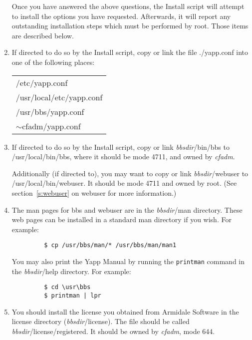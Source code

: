 \documentclass[twoside]{report}
\begin{document}
\begin{enumerate}
      Once you have answered the above questions, the Install script will 
      attempt to install the options you have requested.  Afterwards, it
      will report any outstanding installation steps which must be performed
      by root.  Those items are described below.

   \item If directed to do so by the Install script, copy or link the 
      file ./yapp.conf into one of the following places:

      \begin{tabular}{l}
      /etc/yapp.conf \\
      /usr/local/etc/yapp.conf \\
      /usr/bbs/yapp.conf \\
      $\sim$cfadm/yapp.conf\\
      \end{tabular}

   \item If directed to do so by the Install script, copy or link 
         {\em bbsdir}/bin/bbs to /usr/local/bin/bbs, where it should be 
         mode 4711, and owned by {\em cfadm}.

         Additionally (if directed to), you may want to copy or link 
         {\em bbsdir}/webuser to /usr/local/bin/webuser.  It 
         should be mode 4711 and owned by root.  (See section~\ref{s:webuser} 
         on webuser for more information.)

   \item The man pages for bbs and webuser are in the {\em bbsdir}/man 
         directory.  These web pages can be installed in a standard man 
         directory if you wish.  For example:
         \begin{verbatim}
         $ cp /usr/bbs/man/* /usr/bbs/man/man1
         \end{verbatim}
         \vspace{-12pt}
   
         You may also print the Yapp Manual by running the 
         {\tt printman} command in the {\em bbsdir}/help 
         directory.  For example:
         \begin{verbatim}
         $ cd \usr\bbs
         $ printman | lpr
         \end{verbatim}
         \vspace{-12pt}
   
   \item You should install the license you obtained from Armidale Software in
      the license directory ({\em bbsdir}/license).  The file should be called
      {\em bbsdir}/license/registered.  It should be owned by {\em cfadm},
      mode 644.


\end{enumerate}
\end{document}
